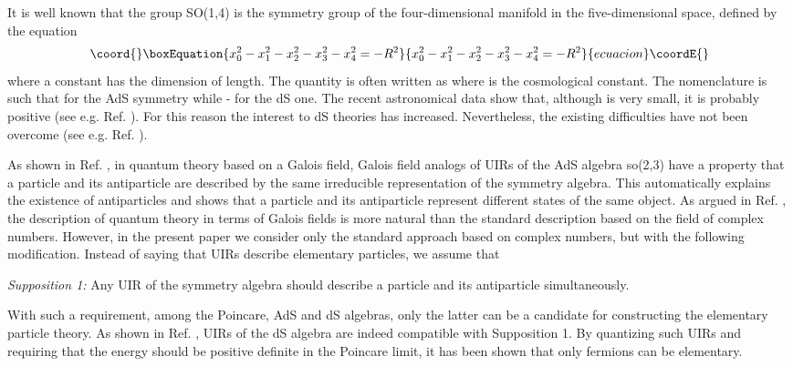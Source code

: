 \documentclass[a4paper,12pt]{article}%
\begin{document}
It is well known that the group SO(1,4) is the symmetry 
group of the four-dimensional manifold in the five-dimensional 
space, defined by the equation 
\begin{equation}\coord{}\boxEquation{
 x_0^2-x_1^2-x_2^2-x_3^2-x_4^2=-R^2
\label{1}
}{
 x_0^2-x_1^2-x_2^2-x_3^2-x_4^2=-R^2
}{ecuacion}\coordE{}\end{equation}
where a constant \coordHE{} has the dimension of length.
The quantity \coordHE{} is often written as \coordHE{} where
\myHighlight{$\Lambda$}\coordHE{} is the cosmological constant. 
The nomenclature is such that \coordHE{} for  
the AdS symmetry while \coordHE{} - for the dS one.
The recent astronomical data show that, although
\myHighlight{$\Lambda$}\coordHE{} is very small, it is probably positive 
(see e.g. Ref. \cite{Perlmutter}). For this reason the 
interest to dS theories has increased. Nevertheless, the existing
difficulties have not been overcome (see e.g. Ref. \cite{Witten}).

As shown in Ref. \cite{lev2}, in 
quantum theory based on a Galois field, Galois field analogs
of UIRs of the AdS algebra so(2,3) have a property 
that a particle and 
its antiparticle are described by the same irreducible
representation of the symmetry algebra. This automatically 
explains the existence of antiparticles and shows that a 
particle and its antiparticle represent different states of 
the same object. 
As argued in Ref. \cite{lev2}, 
the description of quantum theory in terms of Galois fields
is more natural than the standard description based on the
field of complex numbers. However, in the present paper we
consider only the standard approach based on complex numbers,
but with the following 
modification. Instead of saying that UIRs 
describe elementary particles, we assume that

{\it Supposition 1:} Any UIR of the symmetry algebra should 
describe a particle and its antiparticle simultaneously.

With such a requirement, among the Poincare, AdS and dS
algebras, only the latter can be a candidate for 
constructing the
elementary particle theory. As shown in Ref. \cite{hep}, 
UIRs of the dS algebra are indeed compatible with Supposition 1. 
By quantizing such UIRs and requiring that the energy should be
positive definite in the Poincare limit, it has been shown 
that only fermions can be elementary. 
\end{document}
